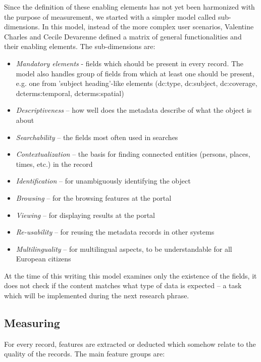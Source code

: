 Since the definition of these enabling elements has not yet been harmonized with the purpose of measurement, we started with a simpler model called sub-dimensions. In this model, instead of the more complex user scenarios, Valentine Charles and Cecile Devarenne defined a matrix of general functionalities and their enabling elements. The sub-dimensions are:

\begin{itemize}
 \setlength{\parskip}{0pt}
 \setlength{\itemsep}{0pt plus 1pt}
\item \emph{Mandatory elements} - fields which should be present in every record. The model also handles group of fields from which at least one should be present, e.g. one from 'subject heading'-like elements (dc:type, dc:subject, dc:coverage, dcterms:temporal, dcterms:spatial)
\item \emph{Descriptiveness} – how well does the metadata describe of what the object is about
\item \emph{Searchability} – the fields most often used in searches
\item \emph{Contextualization} – the basis for finding connected entities (persons, places, times, etc.) in the record
\item \emph{Identification} – for unambiguously identifying the object
\item \emph{Browsing} – for the browsing features at the portal
\item \emph{Viewing} – for displaying results at the portal
\item \emph{Re-usability} – for reusing the metadata records in other systems
\item \emph{Multilinguality} – for multilingual aspects, to be understandable for all European citizens
\end{itemize}

At the time of this writing this model examines only the existence of the fields, it does not check if the content matches what type of data is expected -- a task which will be implemented during the next research phrase.

\subsection{Measuring}

For every record, features are extracted or deducted which somehow relate to the quality of the records. The main feature groups are:

